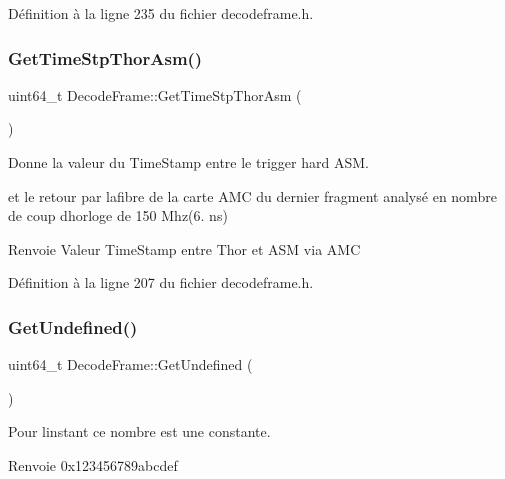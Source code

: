 Définition à la ligne 235 du fichier decodeframe.\+h.

\mbox{\label{class_decode_frame_a69475a7cd412ac056bc97f16768b470b}} 
\subsubsection{\texorpdfstring{Get\+Time\+Stp\+Thor\+Asm()}{GetTimeStpThorAsm()}}
{\footnotesize\ttfamily uint64\+\_\+t Decode\+Frame\+::\+Get\+Time\+Stp\+Thor\+Asm (\begin{DoxyParamCaption}{ }\end{DoxyParamCaption})\hspace{0.3cm}{\ttfamily [inline]}}



Donne la valeur du Time\+Stamp entre le trigger hard A\+SM. 

et le retour par lafibre de la carte A\+MC du dernier fragment analysé en nombre de coup d\textquotesingle{}horloge de 150 Mhz(6. ns) \begin{DoxyReturn}{Renvoie}
Valeur Time\+Stamp entre Thor et A\+SM via A\+MC 
\end{DoxyReturn}


Définition à la ligne 207 du fichier decodeframe.\+h.

\mbox{\label{class_decode_frame_a77f130ef36c084573decb71523cb74a1}} 
\subsubsection{\texorpdfstring{Get\+Undefined()}{GetUndefined()}}
{\footnotesize\ttfamily uint64\+\_\+t Decode\+Frame\+::\+Get\+Undefined (\begin{DoxyParamCaption}{ }\end{DoxyParamCaption})\hspace{0.3cm}{\ttfamily [inline]}}



Pour l\textquotesingle{}instant ce nombre est une constante. 

\begin{DoxyReturn}{Renvoie}
0x123456789abcdef 
\end{DoxyReturn}


